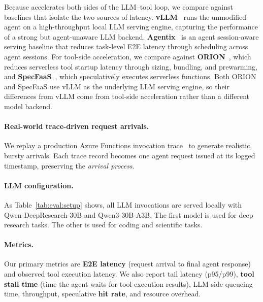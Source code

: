 Because \sys accelerates both sides of the LLM--tool loop, we compare against baselines that isolate the two sources of latency.
\textbf{vLLM}~\cite{kwon2023efficient} runs the unmodified agent on a high-throughput local LLM serving engine, capturing the performance of a strong but agent-unaware LLM backend.
\textbf{Agentix}~\cite{luo2025autellix} is an agent session-aware serving baseline that reduces task-level E2E latency through scheduling across agent sessions.
For tool-side acceleration, we compare against \textbf{ORION}~\cite{orion}, which reduces serverless tool startup latency through sizing, bundling, and prewarming, and \textbf{SpecFaaS}~\cite{stojkovic2023specfaas}, which speculatively executes serverless functions.
Both ORION and SpecFaaS use vLLM as the underlying LLM serving engine, so their differences from vLLM come from tool-side acceleration rather than a different model backend.


\paragraph{Real-world trace-driven request arrivals.}
We replay a production Azure Functions invocation trace~\cite{254430} to generate realistic, bursty arrivals.
Each trace record becomes one agent request issued at its logged timestamp, preserving the \emph{arrival process}.

\paragraph{LLM configuration.}
As Table~\ref{tab:eval:setup} shows, all LLM invocations are served locally with Qwen-DeepResearch-30B and Qwen3-30B-A3B. The first model is used for deep research tasks. The other is used for coding and scientific tasks.



\paragraph{Metrics.}
Our primary metrics are \textbf{E2E latency} (request arrival to final agent response) and observed tool execution latency.
We also report tail latency (p95/p99), \textbf{tool stall time} (time the agent waits for tool execution results), LLM-side queueing time, throughput, speculative \textbf{hit rate}, and resource overhead.

